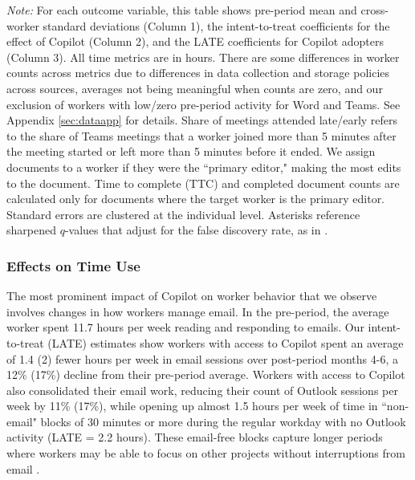 \documentclass{article}
\newenvironment{tablenotes}{
    \begin{flushleft} \small
    \textit{Note:} 
}{
    \end{flushleft}
}
\begin{document}
\begin{table}[htbp]
  \caption{Effects of Copilot Provision and Takeup} 
    \label{table:main_results}    
    \begin{tablenotes} For each outcome variable, this table shows pre-period mean and cross-worker standard deviations (Column 1), the intent-to-treat coefficients for the effect of Copilot (Column 2), and the LATE coefficients for Copilot adopters (Column 3). All time metrics are in hours. There are some differences in worker counts across metrics due to differences in data collection and storage policies across sources, averages not being meaningful when counts are zero, and our exclusion of workers with low/zero pre-period activity for Word and Teams. See Appendix \ref{sec:dataapp} for details. Share of meetings attended late/early refers to the share of Teams meetings that a worker joined more than 5 minutes after the meeting started or left more than 5 minutes before it ended. We assign documents to a worker if they were the ``primary editor," making the  most edits to the document. Time to complete (TTC) and completed document counts are calculated only for documents where the target worker is the primary editor. Standard errors are clustered at the individual level.  Asterisks reference sharpened $q$-values that adjust for the false discovery rate, as in \citet{anderson2008multiple}.
    \end{tablenotes}
\end{table}

\subsubsection{Effects on Time Use}

The most prominent impact of Copilot on worker behavior that we observe involves changes in how workers manage email. In the pre-period, the average worker spent 11.7 hours per week reading and responding to emails. Our intent-to-treat (LATE) estimates show workers with access to Copilot spent an average of 1.4 (2) fewer hours per week in email sessions over post-period months 4-6, a 12\% (17\%) decline from their pre-period average. Workers with access to Copilot also consolidated their email work, reducing their count of Outlook sessions per week by 11\% (17\%), while opening up almost 1.5 hours per week of time in ``non-email" blocks of 30 minutes or more during the regular workday with no Outlook activity (LATE = 2.2 hours). These email-free blocks capture longer periods where workers may be able to focus on other projects without interruptions from email \citep{jackson2001cost}. 
\end{document}
